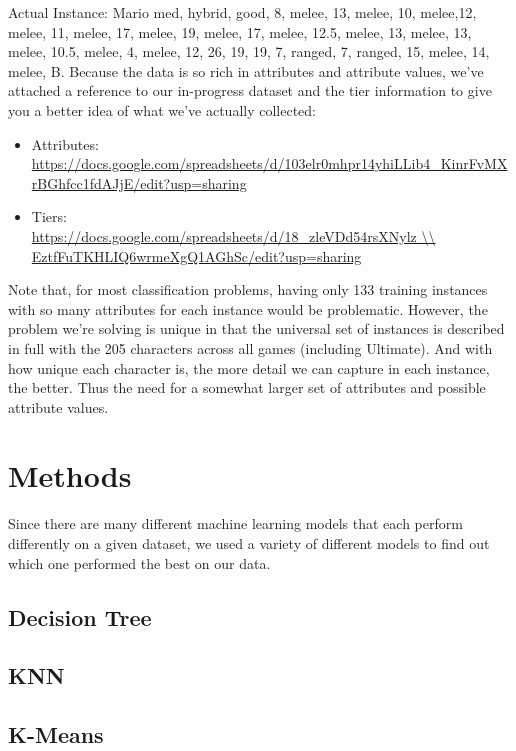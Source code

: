 \documentclass{article}
\begin{document}
Actual Instance: Mario
med, hybrid, good, 8, melee, 13, melee, 10, melee,12, melee, 11, melee, 17, melee, 19, melee, 17, melee, 12.5, melee, 13, melee, 13, melee, 10.5, melee,  4,  melee, 12, 26, 19, 19, 7, ranged, 7, ranged, 15, melee, 14, melee, B.
Because the data is so rich in attributes and attribute values, we’ve attached a reference to our in-progress dataset  and the tier information to give you a better idea of what we’ve actually collected:
\begin{itemize}
  \item
    Attributes: \\ \url{https://docs.google.com/spreadsheets/d/103elr0mhpr14yhiLLib4\_KinrFvMXrBGhfcc1fdAJjE/edit?usp=sharing}
  \item Tiers: \\ \url{https://docs.google.com/spreadsheets/d/18\_zleVDd54rsXNylz \\ EztfFuTKHLIQ6wrmeXgQ1AGhSc/edit?usp=sharing}
\end{itemize}

Note that, for most classification problems, having only 133 training instances with so many attributes for each instance would be problematic. However, the problem we’re solving is unique in that the universal set of instances is described in full with the 205 characters across all games (including Ultimate). And with how unique each character is, the more detail we can capture in each instance, the better. Thus the need for a somewhat larger set of attributes and possible attribute values.

\section{Methods}

Since there are many different machine learning models that each perform differently on a given dataset, we used a variety of different models to find out which one performed the best on our data.

\subsection{Decision Tree}
\subsection{KNN}
\subsection{K-Means}
\end{document}
